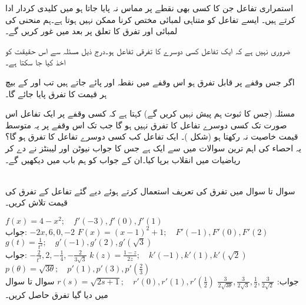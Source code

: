 استمراری تفاعل جن کا کسی بھی نقطے پر مماس نہ پایا جاتا ہو  میں کلیدی کردار ادا کرتے ہیں۔ ایسے تفاعل کو متناہی لمبائی مختص کرنا ممکن نہیں ہوتا ہے۔ہم منحنی کی لمبائی اور تفرق کا تعلق پر بعد میں غور کریں گے۔

ضروری نہیں ہے کہ ایک تفاعل کسی دوسرے کا تفرقی تفاعل ہو۔درج ذیل مسئلہ سے اس حقیقت کو اخذ کیا جا سکتا ہے۔

اگر جس وقفے پر  قابل تفرق ہو اس وقفے میں نقطہ  اور  پائے جاتے ہیں تب   اور  کے بیچ ہر قیمت کا تفرق  پایا جائے گا۔ 

مسئلہ  (جس کا ثبوت ہم پیش نہیں کریں گے)  کہتا ہے کہ کسی وقفے پر ایک تفاعل اس صورت تک کسی دوسرے تفاعل کا تفرق نہیں ہو گا جب تک اس وقفے پر یہ متوسط قیمت خاصیت نہ رکھتا ہو (شکل )۔ ایک تفاعل کب کسی دوسرے تفاعل کا تفرق ہو گا؟ یہ احصاء کی اہم ترین سوالات میں سے ایک ہے جس کا جواب نیوٹن اور لیبنٹز نے دے کر ریاضیات میں انقلاب برپا کیا۔ان کے جواب کو ہم باب میں دیکھیں گے۔

\\
سوال  تا سوال  میں تفرق کی تعریف استعمال کرتے ہوئے دیے گئے تفاعل کے تفرق کی قیمت تلاش کریں۔  

\quad
$f(x)=4-x^2; \quad f'(-3), f'(0), f'(1)$\\
جواب:\quad
$-2x,6,0,-2$
$F(x)=(x-1)^2+1;\quad F'(-1), F'(0), F'(2)$
$g(t)=\tfrac{1}{t^2};\quad g'(-1), g'(2), g'(\sqrt{3})$\\
جواب:\quad
$-\tfrac{2}{t^3},2,-\tfrac{1}{4},-\tfrac{2}{3\sqrt{3}}$
$k(z)=\tfrac{1-z}{2z};\quad k'(-1), k'(1), k'(\sqrt{2})$
$p(\theta)=\sqrt{3\theta};\quad p'(1), p'(3), p'(\tfrac{2}{3})$\\
جواب:\quad
$\tfrac{3}{2\sqrt{3\theta}},\tfrac{3}{2\sqrt{3}},\tfrac{1}{2},\tfrac{3}{2\sqrt{2}}$
\quad
$r(s)=\sqrt{2s+1};\quad r'(0), r'(1), r'(\tfrac{1}{2})$
سوال  تا سوال  میں دیا گیا تفرق حاصل کریں۔


